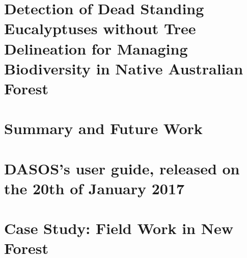 \documentclass[11pt,nofootinbib]{report}
\begin{document}
	\chapter{Detection of Dead Standing Eucalyptuses without Tree Delineation for Managing Biodiversity in Native Australian Forest}\label{Classifications}
		
		\newpage
	\chapter{Summary and Future Work}\label{Conclusions}
		
		\newpage
		
	    
	    {}
        \newpage

  
   	
				
				
	\begin{appendices}
	\chapter{DASOS's user guide, released on the 20th of January 2017}\label{DASOS_userGuide}
		 	
	\chapter{Case Study: Field Work in New Forest}\label{Fieldwork}
		 
		\newpage
	\end{appendices}
    
\end{document}

